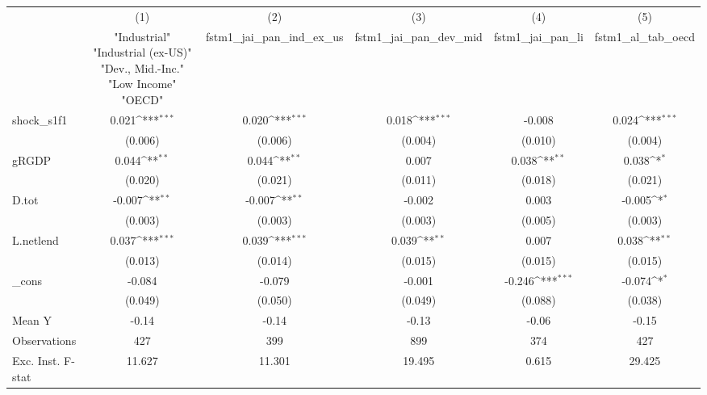 {
\def\sym#1{\ifmmode^{#1}\else\(^{#1}\)\fi}
\begin{tabular}{l*{5}{c}}
\toprule
            &\multicolumn{1}{c}{(1)}&\multicolumn{1}{c}{(2)}&\multicolumn{1}{c}{(3)}&\multicolumn{1}{c}{(4)}&\multicolumn{1}{c}{(5)}\\
            &\multicolumn{1}{c}{ "Industrial" "Industrial (ex-US)" "Dev., Mid.-Inc." "Low Income" "OECD" }&\multicolumn{1}{c}{fstm1\_jai\_pan\_ind\_ex\_us}&\multicolumn{1}{c}{fstm1\_jai\_pan\_dev\_mid}&\multicolumn{1}{c}{fstm1\_jai\_pan\_li}&\multicolumn{1}{c}{fstm1\_al\_tab\_oecd}\\
\midrule
shock\_s1f1  &       0.021\sym{***}&       0.020\sym{***}&       0.018\sym{***}&      -0.008         &       0.024\sym{***}\\
            &     (0.006)         &     (0.006)         &     (0.004)         &     (0.010)         &     (0.004)         \\
\addlinespace
gRGDP       &       0.044\sym{**} &       0.044\sym{**} &       0.007         &       0.038\sym{**} &       0.038\sym{*}  \\
            &     (0.020)         &     (0.021)         &     (0.011)         &     (0.018)         &     (0.021)         \\
\addlinespace
D.tot       &      -0.007\sym{**} &      -0.007\sym{**} &      -0.002         &       0.003         &      -0.005\sym{*}  \\
            &     (0.003)         &     (0.003)         &     (0.003)         &     (0.005)         &     (0.003)         \\
\addlinespace
L.netlend   &       0.037\sym{***}&       0.039\sym{***}&       0.039\sym{**} &       0.007         &       0.038\sym{**} \\
            &     (0.013)         &     (0.014)         &     (0.015)         &     (0.015)         &     (0.015)         \\
\addlinespace
\_cons      &      -0.084         &      -0.079         &      -0.001         &      -0.246\sym{***}&      -0.074\sym{*}  \\
            &     (0.049)         &     (0.050)         &     (0.049)         &     (0.088)         &     (0.038)         \\
\midrule
Mean Y      &       -0.14         &       -0.14         &       -0.13         &       -0.06         &       -0.15         \\
Observations&         427         &         399         &         899         &         374         &         427         \\
Exc. Inst. F-stat&      11.627         &      11.301         &      19.495         &       0.615         &      29.425         \\
\bottomrule
\end{tabular}
}
